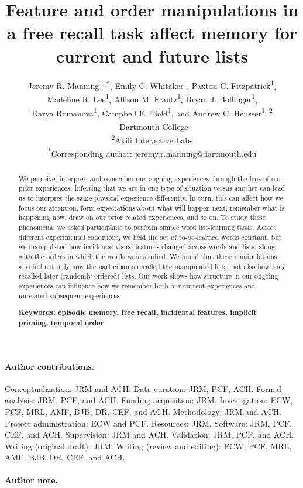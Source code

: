 \documentclass[11pt]{article}
\title{\large Feature and order manipulations in a free recall task affect memory for current and future lists}
\author{\small{Jeremy R. Manning\textsuperscript{1, *}}, \small{Emily C.
Whitaker\textsuperscript{1}}, \small{Paxton C. Fitzpatrick\textsuperscript{1}},
\\\small{Madeline R. Lee\textsuperscript{1}}, \small{Allison M. Frantz\textsuperscript{1}},
\small{Bryan J. Bollinger\textsuperscript{1}},\\\small{Darya Romanova\textsuperscript{1}},
\small{Campbell E. Field\textsuperscript{1}}, and \small{Andrew C. Heusser\textsuperscript{1,
2}}\\\small{\textsuperscript{1}Dartmouth College}\\\small{\textsuperscript{2}Akili
Interactive Labs}\\\small{\textsuperscript{*}Corresponding author:
jeremy.r.manning@dartmouth.edu}}
\date{}
\begin{document}
\begin{titlepage}
\singlespacing
\footnotesize
\maketitle
\thispagestyle{empty}

\begin{abstract} \footnotesize{We perceive, interpret, and remember our ongoing
experiences through the lens of our prior experiences. Inferring that we are in
one type of situation versus another can lead us to interpret the same physical
experience differently. In turn, this can affect how we focus our attention,
form expectations about what will happen next, remember what is happening now,
draw on our prior related experiences, and so on. To study these phenomena, we
asked participants to perform simple word list-learning tasks. Across different
experimental conditions, we held the set of to-be-learned words constant, but
we manipulated how incidental visual features changed across words and lists,
along with the orders in which the words were studied. We found that these
manipulations affected not only how the participants recalled the manipulated
lists, but also how they recalled later (randomly ordered) lists. Our work
shows how structure in our ongoing experiences can influence how we remember
both our current experiences and unrelated subsequent experiences.

\textbf{Keywords: episodic memory, free recall, incidental features, implicit
priming, temporal order}}

\end{abstract}

\paragraph*{Author contributions.}

Conceptualization: JRM and ACH. Data curation: JRM, PCF, ACH. Formal analysis:
JRM, PCF, and ACH. Funding acquisition: JRM. Investigation: ECW, PCF, MRL, AMF,
BJB, DR, CEF, and ACH. Methodology: JRM and ACH. Project administration: ECW
and PCF. Resources: JRM. Software: JRM, PCF, CEF, and ACH. Supervision: JRM and
ACH. Validation: JRM, PCF, and ACH. Writing (original draft): JRM. Writing
(review and editing): ECW, PCF, MRL, AMF, BJB, DR, CEF, and ACH.

\paragraph*{Author note.}


\end{titlepage}
\end{document}
